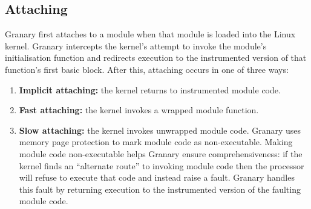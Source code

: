 \documentclass{sigplanconf}
\newcommand{\comment}[1]{}
\begin{document}









\subsection{Attaching}
Granary first attaches to a module when that module is loaded into the Linux kernel. Granary intercepts the kernel's attempt to invoke the module's initialisation function and redirects execution to the instrumented version of that function's first basic block. After this, attaching occurs in one of three ways: \begin{enumerate}
	\item {\bf Implicit attaching:} the kernel returns to instrumented module code.
	\item {\bf Fast attaching:} the kernel invokes a wrapped module function.
	\item {\bf Slow attaching:} the kernel invokes unwrapped module code. Granary uses memory page protection to mark module code as non-executable. Making module code non-executable helps Granary ensure comprehensiveness: if the kernel finds an ``alternate route'' to invoking module code then the processor will refuse to execute that code and instead raise a fault. Granary handles this fault by returning execution to the instrumented version of the faulting module code.
\end{enumerate}
\end{document}
